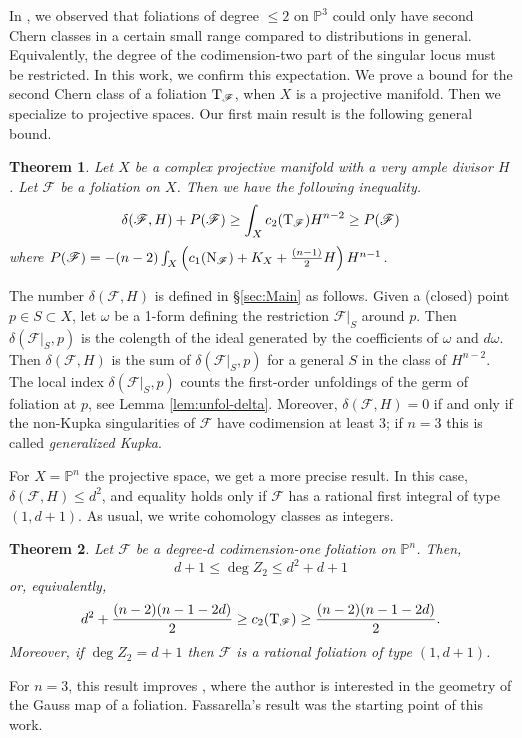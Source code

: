 \documentclass[a4paper, 11pt]{amsart}
\theoremstyle{plain}
\newtheorem{MainTheorem}{Theorem}
\numberwithin{theorem}{section}
\theoremstyle{definition}
\newcommand{\p}[1]{{\mathbb{P}^{#1}}}
\newcommand{\pn}{{\mathbb{P}^{n}}}
\newcommand{\sF}{\mathscr{F}}
\newcommand{\tF}{{\rm T}_\mathscr{F}}
\newcommand{\nF}{{\rm N}_\mathscr{F}}
\begin{document}
In \cite{GJM-deg2}, we observed that foliations of degree $\leq 2$ on $\p3$ could only have second Chern classes in a certain small range compared to distributions in general. Equivalently, the degree of the codimension-two part of the singular locus must be restricted. In this work, we confirm this expectation. We prove a bound for the second Chern class of a foliation $\tF$, when $X$ is a projective manifold. Then we specialize to projective spaces. Our first main result is the following general bound. 

\begin{MainTheorem}\label{thm:A}
 Let $X$ be a complex projective manifold with a very ample divisor $H$. Let $\sF$ be a foliation on $X$. Then we have the following inequality.
  \[
  \delta(\sF,H) + P(\sF) \geq \int_Xc_2(\tF)H^{n-2} \geq P(\sF)
  \]
 where $P(\sF) = -(n-2)\int_X \left(  c_1(\nF) +K_X +\frac{(n-1) }{2} H\right)H^{n-1}$.
\end{MainTheorem}

The number $\delta(\sF,H)$ is defined in \S\ref{sec:Main} as follows. Given a (closed) point $p \in S\subset X$, let $\omega$ be a 1-form defining the restriction $\sF|_S$ around $p$. Then $\delta(\sF|_S,p)$ is the colength of the ideal generated by the coefficients of $\omega$ and $d\omega$. Then $\delta(\sF,H)$ is the sum of $\delta(\sF|_S,p)$ for a general $S $ in the class  of $ H^{n-2}$. The local index $\delta(\sF|_S,p)$ counts the first-order unfoldings of the germ of foliation at $p$, see Lemma \ref{lem:unfol-delta}. Moreover, $\delta(\sF,H) = 0$ if and only if the non-Kupka singularities of $\sF$ have codimension at least $3$; if $n=3$ this is called \emph{generalized Kupka}.  


For $X = \pn$ the projective space, we get a more precise result. In this case, $\delta(\sF,H) \leq d^2$, and equality holds only if $\sF$ has a rational first integral of type $(1,d+1)$. As usual, we write cohomology classes as integers. 

\begin{MainTheorem}\label{thm:B}
Let $\sF$ be a degree-$d$ codimension-one foliation on $\pn$. Then, 
\[
d+ 1 \leq \deg Z_2 \leq d^2+d+1
\]
or, equivalently, 
\[
d^2 + \frac{(n-2)(n-1-2d)}{2} \geq c_2(\tF) \geq \frac{(n-2)(n-1-2d)}{2}.
\]
Moreover, if $\deg Z_2 = d+1$ then $\sF$ is a rational foliation of type $(1,d+1)$.   
\end{MainTheorem}

For $n=3$, this result improves \cite[Proposição 2.6]{FassarellaThesis}, where the author is interested in the geometry of the Gauss map of a foliation. Fassarella's result was the starting point of this work. 
\end{document}
